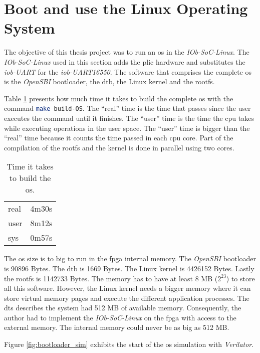 \section{Boot and use the Linux Operating System}
\label{section:boot_linux}
The objective of this thesis project was to run an \acrlong{os} in the \textit{IOb-SoC-Linux}. The \textit{IOb-SoC-Linux} used in this section adds the \acrshort{plic} hardware and substitutes the \textit{iob-UART} for the \textit{iob-UART16550}. The software that comprises the complete \acrshort{os} is the \textit{OpenSBI} bootloader, the \acrlong{dtb}, the Linux kernel and the \acrlong{rootfs}.

Table \ref{tab:time_os} presents how much time it takes to build the complete \acrshort{os} with the command \lstinline[language=sh]{make build-OS}. The \enquote{real} time is the time that passes since the user executes the command until it finishes. The \enquote{user} time is the time the \acrshort{cpu} takes while executing operations in the user space. The \enquote{user} time is bigger than the \enquote{real} time because it counts the time passed in each \acrshort{cpu} core. Part of the compilation of the \acrshort{rootfs} and the kernel is done in parallel using two cores.

\begin{table}[!ht]
    \centering
    \begin{tabular}{ll}
    real & 4m30s \\
    user & 8m12s \\
    sys  & 0m57s
    \end{tabular}
    \caption{Time it takes to build the \acrshort{os}.}
    \label{tab:time_os}
\end{table}

The \acrshort{os} size is to big to run in the \acrshort{fpga} internal memory. The \textit{OpenSBI} bootloader is 90896 Bytes. The \acrlong{dtb} is 1669 Bytes. The Linux kernel is 4426152 Bytes. Lastly the \acrlong{rootfs} is 1142733 Bytes. The memory has to have at least 8 MB ($2^23$) to store all this software. However, the Linux kernel needs a bigger memory where it can store virtual memory pages and execute the different application processes. The \acrlong{dts} describes the system had 512 MB of available memory. Consequently, the author had to implement the \textit{IOb-SoC-Linux} on the \acrshort{fpga} with access to the external memory. The internal memory could never be as big as 512 MB.

Figure \ref{fig:bootloader_sim} exhibits the start of the \acrshort{os} simulation with \textit{Verilator}.

